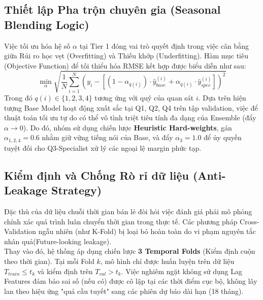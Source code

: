 \documentclass[10pt,a4paper]{article}
\begin{document}
\subsection{Thiết lập Pha trộn chuyên gia (Seasonal Blending Logic)}
\label{app: ML blending Logic}
Việc tối ưu hóa hệ số $\alpha$ tại Tier 1 đóng vai trò quyết định trong việc cân bằng giữa Rủi ro học vẹt (Overfitting) và Thiếu khớp (Underfitting). Hàm mục tiêu (Objective Function) để tối thiểu hóa RMSE kết hợp được biểu diễn như sau:
\begin{equation}
  \min_{\alpha} \sqrt{\frac{1}{N} \sum_{i=1}^{N} \left( y_i - \left[ (1 - \alpha_{q(i)}) \cdot \hat{y}_{base}^{(i)} + \alpha_{q(i)} \cdot \hat{y}_{spec}^{(i)} \right] \right)^2}
\end{equation}
Trong đó $q(i) \in \{1, 2, 3, 4\}$ tương ứng với quý của quan sát $i$. Dựa trên hiện tượng Base Model hoạt động xuất sắc tại Q1, Q2, Q4 trên tập validation, việc để thuật toán tối ưu tự do có thể vô tình triệt tiêu tính đa dạng của Ensemble (đẩy $\alpha \to 0$). Do đó, nhóm sử dụng chiến lược \textbf{Heuristic Hard-weights}, gán $\alpha_{1,2,4} = 0.6$ nhằm giữ vững tiếng nói của Base, và đẩy $\alpha_3 = 1.0$ để ủy quyền tuyệt đối cho Q3-Specialist xử lý các ngoại lệ margin phức tạp.
\subsection{Kiểm định và Chống Rò rỉ dữ liệu (Anti-Leakage Strategy)}
\label{app: ML Anti-Leakage Strategy}
Đặc thù của dữ liệu chuỗi thời gian bán lẻ đòi hỏi việc đánh giá phải mô phỏng chính xác quá trình luân chuyển thời gian trong thực tế. Các phương pháp Cross-Validation ngẫu nhiên (như K-Fold) bị loại bỏ hoàn toàn do vi phạm nguyên tắc nhân quả(Future-looking leakage).\\
Thay vào đó, hệ thống áp dụng chiến lược \textbf{3 Temporal Folds} (Kiểm định cuộn theo thời gian). Tại mỗi Fold $k$, mô hình chỉ được huấn luyện trên dữ liệu $T_{train} \le t_k$ và kiểm định trên $T_{val} > t_k$. Việc nghiêm ngặt không sử dụng Lag Features đảm bảo sai số (nếu có) được cô lập tại các thời điểm cục bộ, không lây lan theo hiệu ứng "quả cầu tuyết" sang các phiên dự báo dài hạn (18 tháng).
\end{document}
